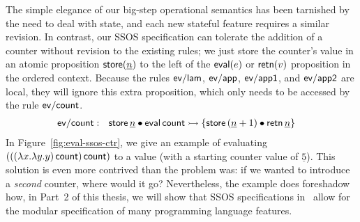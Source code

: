The simple elegance of our big-step operational semantics has been
tarnished by the need to deal with state, and each new stateful
feature requires a similar revision.  In contrast, our SSOS
specification can tolerate the addition of a counter without revision
to the existing rules; we just store the counter's value in an atomic
proposition ${\sf store}(\underline{n})$ to the left of the ${\sf
  eval}(e)$ or ${\sf retn}(v)$ proposition in the ordered
context. Because the rules ${\sf ev/lam}$, ${\sf ev/app}$, ${\sf
  ev/app1}$, and ${\sf ev/app2}$ are local, they will ignore this
extra proposition, which only needs to be accessed by the rule ${\sf
  ev/count}$.
\begin{align*}
{\sf ev/count} &:~~
  {\sf store}\,\underline n \mathbin{\bullet} {\sf eval}\,{\sf count}
    \rightarrowtail \{ {\sf store}\,(\underline n + 1) 
      \mathbin{\bullet} {\sf retn}\,\underline n \}
\end{align*}
In Figure~\ref{fig:eval-ssos-ctr}, we give an example of evaluating
$(((\lambda x.\lambda y.y)\,{\sf count})\,{\sf count})$ to a value
(with a starting counter value of $\underline 5$). This solution is
even more contrived than the problem was: if we wanted to introduce a
{\it second} counter, where would it go? Nevertheless, the example
does foreshadow how, in Part~2 of this thesis, we will show that SSOS
specifications in \sls~allow for the modular specification of many
programming language features.

